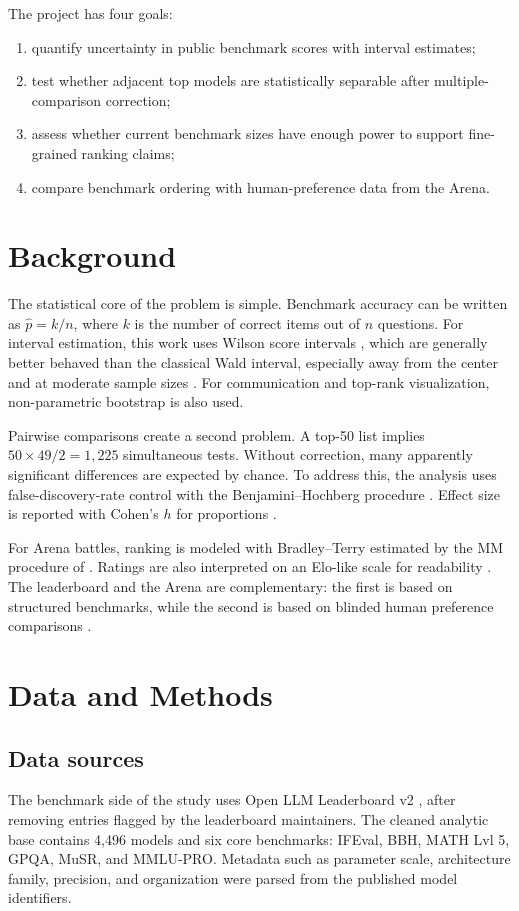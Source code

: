 \documentclass[11pt,a4paper]{article}
\begin{document}
The project has four goals:
\begin{enumerate}
    \item quantify uncertainty in public benchmark scores with interval estimates;
    \item test whether adjacent top models are statistically separable after multiple-comparison correction;
    \item assess whether current benchmark sizes have enough power to support fine-grained ranking claims;
    \item compare benchmark ordering with human-preference data from the Arena.
\end{enumerate}

\section{Background}
The statistical core of the problem is simple. Benchmark accuracy can be written as \(\hat{p}=k/n\), where \(k\) is the number of correct items out of \(n\) questions. For interval estimation, this work uses Wilson score intervals \citep{wilson1927}, which are generally better behaved than the classical Wald interval, especially away from the center and at moderate sample sizes \citep{agresti1998}. For communication and top-rank visualization, non-parametric bootstrap \citep{efron1979} is also used.

Pairwise comparisons create a second problem. A top-50 list implies \(50\times49/2 = 1{,}225\) simultaneous tests. Without correction, many apparently significant differences are expected by chance. To address this, the analysis uses false-discovery-rate control with the Benjamini--Hochberg procedure \citep{benjamini1995}. Effect size is reported with Cohen's \(h\) for proportions \citep{cohen1988}.

For Arena battles, ranking is modeled with Bradley--Terry \citep{bradley1952} estimated by the MM procedure of \citet{ford1957}. Ratings are also interpreted on an Elo-like scale for readability \citep{elo1978}. The leaderboard and the Arena are complementary: the first is based on structured benchmarks, while the second is based on blinded human preference comparisons \citep{zheng2023arena,arena2026}.

\section{Data and Methods}

\subsection{Data sources}
The benchmark side of the study uses Open LLM Leaderboard v2 \citep{huggingface2024leaderboard}, after removing entries flagged by the leaderboard maintainers. The cleaned analytic base contains 4,496 models and six core benchmarks: IFEval, BBH, MATH Lvl 5, GPQA, MuSR, and MMLU-PRO. Metadata such as parameter scale, architecture family, precision, and organization were parsed from the published model identifiers.
\end{document}
